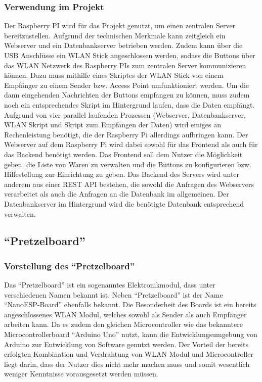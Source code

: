 \documentclass[ngerman]{scrartcl} %
\begin{document}
\subsubsection{Verwendung im Projekt}        
\label{sec:Verwendung des Raspberry PI-1} 
Der Raspberry PI wird für das Projekt genutzt, um einen zentralen Server bereitzustellen. Aufgrund der technischen Merkmale kann zeitgleich ein Webserver und ein Datenbankserver betrieben werden. Zudem kann über die USB Anschlüsse ein WLAN Stick angeschlossen werden, sodass die Buttons über das WLAN Netzwerk des Raspberry PIs zum zentralen Server kommunizieren können. Dazu muss mithilfe eines Skriptes der WLAN Stick von einem Empfänger zu einem Sender bzw. Access Point umfunktioniert werden. Um die dann eingehenden Nachrichten der Buttons empfangen zu können, muss zudem noch ein entsprechendes Skript im Hintergrund laufen, dass die Daten empfängt. Aufgrund von vier parallel laufenden Prozessen (Webserver, Datenbankserver, WLAN Skript und Skript zum Empfangen der Daten) wird einiges an Rechenleistung benötigt, die der Raspberry Pi allerdings aufbringen kann. 
Der Webserver auf dem Raspberry Pi wird dabei sowohl für das Frontend als auch für das Backend benötigt werden. Das Frontend soll dem Nutzer die Möglichkeit geben, die Liste von Waren zu verwalten und die Buttons zu konfigurieren bzw. Hilfestellung zur Einrichtung zu geben. Das Backend des Servers wird unter anderem aus einer REST API bestehen, die sowohl die Anfragen des Webservers verarbeitet als auch die Anfragen an die Datenbank im allgemeinen. 
Der Datenbankserver im Hintergrund wird die benötigte Datenbank entsprechend verwalten. 

\subsection{``Pretzelboard''}        
\label{sec:''Pretzelboard''-1} 

\subsubsection{Vorstellung des ``Pretzelboard''}        
\label{sec:Vorstellung des ``Pretzelboard''} 
Das ``Pretzelboard'' ist ein sogenanntes Elektronikmodul, dass unter verschiedenen Namen bekannt ist. Neben ``Pretzelboard'' ist der Name ``NanoESP-Board'' ebenfalls bekannt. Die Besonderheit des Boards ist ein bereits angeschlossenes WLAN Modul, welches sowohl als Sender als auch Empfänger arbeiten kann. Da es zudem den gleichen Microcontroller wie das bekanntere Microcontrollerboard ``Arduino Uno'' nutzt, kann die Entwicklungsumgebung von Arduino zur Entwicklung von Software genutzt werden. 
Der Vorteil der bereits erfolgten Kombination und Verdrahtung von WLAN Modul und Microcontroller liegt darin, dass der Nutzer dies nicht mehr machen muss und somit wesentlich weniger Kenntnisse vorausgesetzt werden müssen. 
\end{document}
